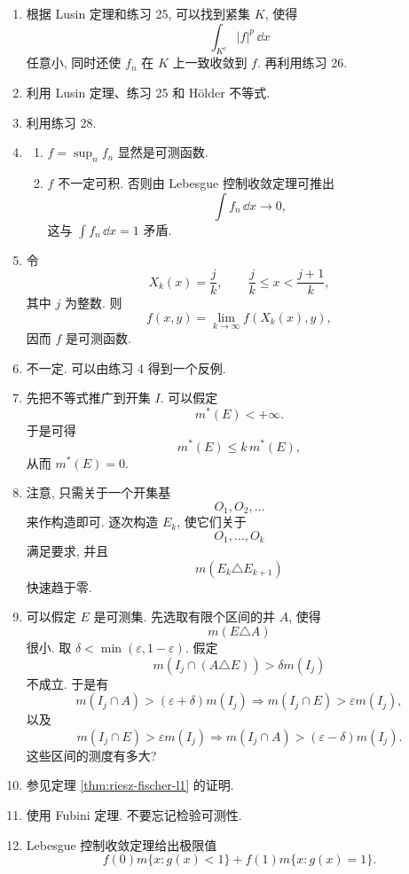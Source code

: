 \begin{enumerate}
	\item 根据 Lusin 定理和练习 25, 可以找到紧集 \(K\), 使得
	\[
	\int_{K^c}|f|^p\,\dd x
	\]
	任意小, 同时还使 \(f_n\) 在 \(K\) 上一致收敛到 \(f\). 再利用练习 26.
	
	\item 利用 Lusin 定理、练习 25 和 H\"older 不等式.
	
	\item 利用练习 28.
	
	\item \begin{enumerate}
		\item \(f=\sup_n f_n\) 显然是可测函数.
		\item \(f\) 不一定可积. 否则由 Lebesgue 控制收敛定理可推出
		\[
		\int f_n\,\dd x\to0,
		\]
		这与 \(\int f_n\,\dd x=1\) 矛盾.
	\end{enumerate}
	
	\item 令
	\[
	X_k(x)=\frac jk,
	\qquad
	\frac jk\leq x<\frac{j+1}{k},
	\]
	其中 \(j\) 为整数. 则
	\[
	f(x,y)=\lim_{k\to\infty}f(X_k(x),y),
	\]
	因而 \(f\) 是可测函数.
	
	\item 不一定. 可以由练习 4 得到一个反例.
	
	\item 先把不等式推广到开集 \(I\). 可以假定
	\[
	m^*(E)<+\infty.
	\]
	于是可得
	\[
	m^*(E)\leq k\,m^*(E),
	\]
	从而 \(m^*(E)=0\).
	
	\item 注意, 只需关于一个开集基
	\[
	O_1,O_2,\ldots
	\]
	来作构造即可. 逐次构造 \(E_k\), 使它们关于
	\[
	O_1,\ldots,O_k
	\]
	满足要求, 并且
	\[
	m(E_k\triangle E_{k+1})
	\]
	快速趋于零.
	
	\item 可以假定 \(E\) 是可测集. 先选取有限个区间的并 \(A\), 使得
	\[
	m(E\triangle A)
	\]
	很小. 取 \(\delta<\min(\varepsilon,1-\varepsilon)\). 假定
	\[
	m(I_j\cap(A\triangle E))>\delta m(I_j)
	\]
	不成立. 于是有
	\[
	m(I_j\cap A)>(\varepsilon+\delta)m(I_j)
	\Longrightarrow
	m(I_j\cap E)>\varepsilon m(I_j),
	\]
	以及
	\[
	m(I_j\cap E)>\varepsilon m(I_j)
	\Longrightarrow
	m(I_j\cap A)>(\varepsilon-\delta)m(I_j).
	\]
	这些区间的测度有多大?
	
	\item 参见定理 \ref{thm:riesz-fischer-l1} 的证明.
	
	\item 使用 Fubini 定理. 不要忘记检验可测性.
	
	\item Lebesgue 控制收敛定理给出极限值
	\[
	f(0)m\{x:g(x)<1\}+f(1)m\{x:g(x)=1\}.
	\]
	

\end{enumerate}

